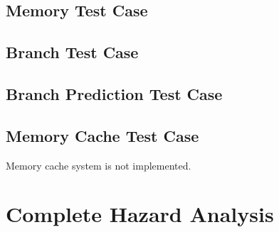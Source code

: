 \subsection{Memory Test Case}

\subsection{Branch Test Case}

\subsection{Branch Prediction Test Case}

\subsection{Memory Cache Test Case}
Memory cache system is not implemented. 

\section{Complete Hazard Analysis}